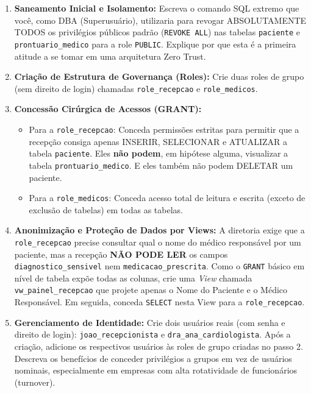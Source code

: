 \begin{enumerate}
    \item \textbf{Saneamento Inicial e Isolamento:} Escreva o comando SQL extremo que você, como DBA (Superusuário), utilizaria para revogar ABSOLUTAMENTE TODOS os privilégios públicos padrão (\texttt{REVOKE ALL}) nas tabelas \texttt{paciente} e \texttt{prontuario\_medico} para a role \texttt{PUBLIC}. Explique por que esta é a primeira atitude a se tomar em uma arquitetura Zero Trust.
    \item \textbf{Criação de Estrutura de Governança (Roles):} Crie duas roles de grupo (sem direito de login) chamadas \texttt{role\_recepcao} e \texttt{role\_medicos}. 
    \item \textbf{Concessão Cirúrgica de Acessos (GRANT):}
    \begin{itemize}
        \item Para a \texttt{role\_recepcao}: Conceda permissões estritas para permitir que a recepção consiga apenas INSERIR, SELECIONAR e ATUALIZAR a tabela \texttt{paciente}. Eles \textbf{não podem}, em hipótese alguma, visualizar a tabela \texttt{prontuario\_medico}. E eles também não podem DELETAR um paciente.
        \item Para a \texttt{role\_medicos}: Conceda acesso total de leitura e escrita (exceto de exclusão de tabelas) em todas as tabelas.
    \end{itemize}
    \item \textbf{Anonimização e Proteção de Dados por Views:} A diretoria exige que a \texttt{role\_recepcao} precise consultar qual o nome do médico responsável por um paciente, mas a recepção \textbf{NÃO PODE LER} os campos \texttt{diagnostico\_sensivel} nem \texttt{medicacao\_prescrita}. 
    Como o \texttt{GRANT} básico em nível de tabela expõe todas as colunas, crie uma \textit{View} chamada \texttt{vw\_painel\_recepcao} que projete apenas o Nome do Paciente e o Médico Responsável. Em seguida, conceda \texttt{SELECT} nesta View para a \texttt{role\_recepcao}.
    \item \textbf{Gerenciamento de Identidade:} Crie dois usuários reais (com senha e direito de login): \texttt{joao\_recepcionista} e \texttt{dra\_ana\_cardiologista}. Após a criação, adicione os respectivos usuários às roles de grupo criadas no passo 2. Descreva os benefícios de conceder privilégios a grupos em vez de usuários nominais, especialmente em empresas com alta rotatividade de funcionários (turnover).
\end{enumerate}

